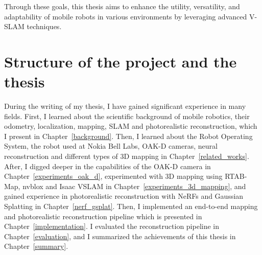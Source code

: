 Through these goals, this thesis aims to enhance the utility, versatility, and adaptability of mobile robots in various environments by leveraging advanced V-SLAM techniques.


\section{Structure of the project and the thesis}

During the writing of my thesis, I have gained significant experience in many fields. First, I learned about the scientific background of mobile robotics, their odometry, localization, mapping, SLAM and photorealistic reconstruction, which I present in Chapter~\ref{background}. Then, I learned about the Robot Operating System, the robot used at Nokia Bell Labs, OAK-D cameras, neural reconstruction and different types of 3D mapping in Chapter~\ref{related_works}. After, I digged deeper in the capabilities of the OAK-D camera in Chapter~\ref{experiments_oak_d}, experimented with 3D mapping using RTAB-Map, nvblox and Isaac VSLAM in Chapter~\ref{experiments_3d_mapping}, and gained experience in photorealistic reconstruction with NeRFs and Gaussian Splatting in Chapter~\ref{nerf_gsplat}. Then, I implemented an end-to-end mapping and photorealistic reconstruction pipeline which is presented in Chapter~\ref{implementation}. I evaluated the reconstruction pipeline in Chapter~\ref{evaluation}, and I summarized the achievements of this thesis in Chapter~\ref{summary}.
